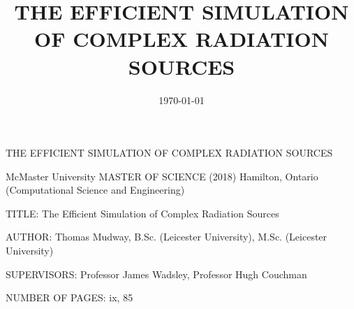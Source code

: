 \documentclass[a4paper, 12pt, oneside]{Thesis}  %
\begin{document}
\pagestyle{empty}
THE EFFICIENT SIMULATION OF COMPLEX RADIATION SOURCES
\clearpage

\frontmatter      %

\title  {THE EFFICIENT SIMULATION OF COMPLEX RADIATION SOURCES}
\addresses  {\groupname\\\deptname\\\univname}  %
\date       {\today}
\subject    {}
\keywords   {}

\maketitle


\fancyhead{}  %
\rhead{\thepage}  %
\lhead{}  %

\pagestyle{fancy}  %

McMaster University MASTER OF SCIENCE (2018) Hamilton, Ontario \\
(Computational Science and Engineering)

TITLE: The Efficient Simulation of Complex Radiation Sources 

AUTHOR: Thomas Mudway, B.Sc. (Leicester University), M.Sc. (Leicester University) 

SUPERVISORS: Professor James Wadsley, Professor Hugh Couchman

NUMBER OF PAGES: ix, 85
\clearpage

\end{document}

